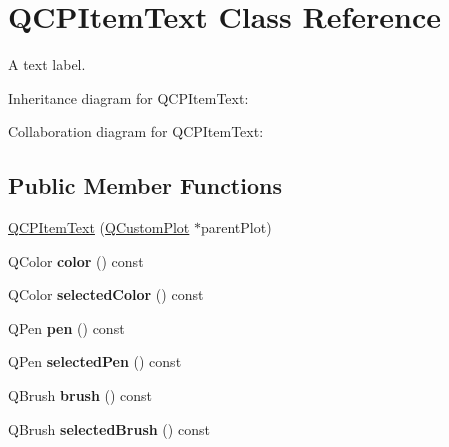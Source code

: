 \hypertarget{class_q_c_p_item_text}{}\section{Q\+C\+P\+Item\+Text Class Reference}
\label{class_q_c_p_item_text}


A text label.  




Inheritance diagram for Q\+C\+P\+Item\+Text\+:


Collaboration diagram for Q\+C\+P\+Item\+Text\+:
\subsection*{Public Member Functions}
\begin{DoxyCompactItemize}
\item 
\hyperlink{class_q_c_p_item_text_a77ff96a2972a00872ff8f8c67143abbe}{Q\+C\+P\+Item\+Text} (\hyperlink{class_q_custom_plot}{Q\+Custom\+Plot} $\ast$parent\+Plot)
\item 
Q\+Color {\bfseries color} () const \hypertarget{class_q_c_p_item_text_ac9cb0a8a27f64d1b40855910ea9ebd03}{}\label{class_q_c_p_item_text_ac9cb0a8a27f64d1b40855910ea9ebd03}

\item 
Q\+Color {\bfseries selected\+Color} () const \hypertarget{class_q_c_p_item_text_a44f690ec0ba6a32e518f2e923c002e39}{}\label{class_q_c_p_item_text_a44f690ec0ba6a32e518f2e923c002e39}

\item 
Q\+Pen {\bfseries pen} () const \hypertarget{class_q_c_p_item_text_a552bd02f46dbcb4b4812559036893352}{}\label{class_q_c_p_item_text_a552bd02f46dbcb4b4812559036893352}

\item 
Q\+Pen {\bfseries selected\+Pen} () const \hypertarget{class_q_c_p_item_text_a70c86ec95133d3e904d1718023fe3c4e}{}\label{class_q_c_p_item_text_a70c86ec95133d3e904d1718023fe3c4e}

\item 
Q\+Brush {\bfseries brush} () const \hypertarget{class_q_c_p_item_text_a38b981dfacb703efa8e27346eebcb5a2}{}\label{class_q_c_p_item_text_a38b981dfacb703efa8e27346eebcb5a2}

\item 
Q\+Brush {\bfseries selected\+Brush} () const \hypertarget{class_q_c_p_item_text_ac6802bbceff1ade0053166c64a5a6966}{}\label{class_q_c_p_item_text_ac6802bbceff1ade0053166c64a5a6966}


\end{DoxyCompactItemize}
